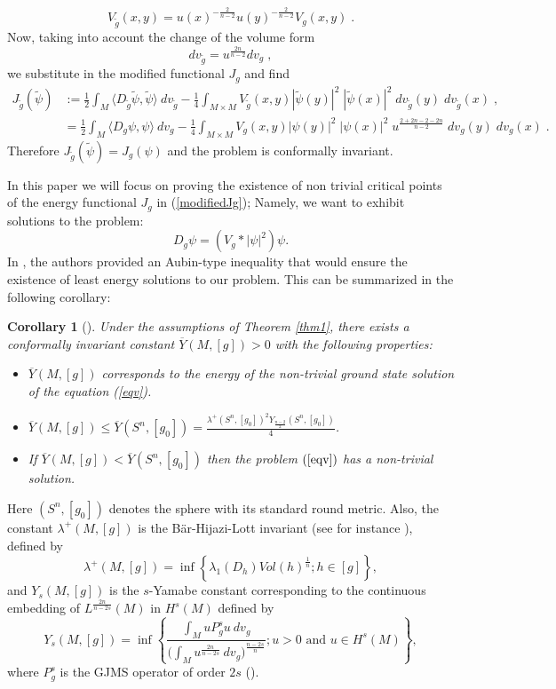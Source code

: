 \documentclass[11pt]{article}
\newtheorem{corollary}{Corollary}[section]
\begin{document}
{$$
V_{\widetilde{g}}(x,y)=u(x)^{-\frac{2}{n-2}} u(y)^{-\frac{2}{n-2}}V_{g}(x,y) \; .
$$
Now, taking into account the change of the volume form
$$dv_{\widetilde{g}}  = u^{\frac{2n}{n-2}}  dv_{g} \; ,$$
we substitute in the modified functional $J_{g}$ and find
\begin{align*}
J_{\widetilde{g}}(\widetilde{\psi}) & := \frac{1}{2}\int_{M}\langle D_{\widetilde{g}}\widetilde{\psi},\widetilde{\psi}\rangle \ dv_{\widetilde{g}}-\frac{1}{4}\int_{M\times M} V_{\widetilde{g}}(x,y)|\widetilde{\psi}(y)|^{2} \; |\widetilde{\psi}(x)|^{2}\; dv_{\widetilde{g}}(y)\; dv_{\widetilde{g}}(x) \;,\\
& = \frac{1}{2}\int_{M}\langle D_{g}\psi,\psi\rangle \ dv_{g}-\frac{1}{4}\int_{M\times M} V_g(x,y)|\psi(y)|^{2} \; |\psi(x)|^{2} \;  u^{\frac{2+2n-2-2n}{n-2}} \; dv_{g}(y)\; dv_{g}(x) \; .
\end{align*}
Therefore $J_{\widetilde{g}}(\widetilde{\psi})=J_{g}(\psi)$ and the problem is conformally invariant.



\noindent
In this paper we will focus on proving the existence of non trivial critical points of the energy functional $J_{g}$ in (\ref{modifiedJg}); Namely, we want to exhibit solutions to the problem:
\begin{equation}\label{eqv}
D_{g}\psi=\left( V_{g}*|\psi|^{2}\right) \psi.
\end{equation}
In \cite{MMM}, the authors provided an Aubin-type inequality that would ensure the existence of least energy solutions to our problem. This can be summarized in the following corollary:
\begin{corollary}[\cite{MMM}]\label{cor1}
Under the assumptions of Theorem \ref{thm1}, there exists a conformally invariant constant $\overline{Y}(M,[g])>0$ with the following properties:
\begin{itemize}
\item[i)] $\overline{Y}(M,[g])$ corresponds to the energy of the non-trivial ground state solution of the equation (\ref{eqv}).
\item[ii)] $\overline{Y}(M,[g])\leq \overline{Y}(S^{n},[g_{0}])=\frac{\lambda^{+}(S^{n}, [g_{0}])^{2} Y_{\frac{n-2}{2}}(S^{n}, [g_{0}])}{4}$.
\item[iii)] If $\overline{Y}(M,[g])< \overline{Y}(S^{n},[g_{0}])$ then the problem $(\ref{eqv})$ has a non-trivial solution.
\end{itemize}
\end{corollary}


\noindent
Here $(S^{n}, [g_{0}])$ denotes the sphere with its standard round metric. Also, the constant $\lambda^{+}(M,[g])$ is the B\"{a}r-Hijazi-Lott invariant (see for instance \cite{Am1,Am2}), defined by
$$\lambda^{+}(M,[g])=\inf\left\{\lambda_{1}(D_{h})Vol(h)^{\frac{1}{n}}; h\in [g]\right\},$$
and $Y_{s}(M,[g])$ is the $s$-Yamabe constant corresponding to the continuous embedding of $L^{\frac{2n}{n-2s}}(M)$ in $H^{s}(M)$ defined by 
$$Y_{s}(M,[g])=\inf\left\{\frac{\int_{M}uP_{g}^{s}u\ dv_{g}}{\Big(\int_{M}u^{\frac{2n}{n-2s}}\ dv_{g}\Big)^{\frac{n-2s}{n}}}; u>0 \text{ and } u\in H^{s}(M)\right\},$$
where $P_{g}^{s}$ is the GJMS operator of order $2s$ (\cite{GJMS,GZ}).


}
\end{document}
